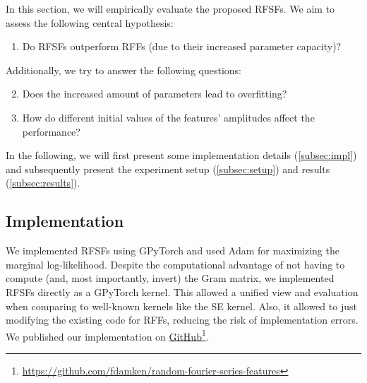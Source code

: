 
In this section, we will empirically evaluate the proposed \acp{RFSF}.
We aim to assess the following central hypothesis:
\begin{enumerate}
    \item Do \acp{RFSF} outperform \acp{RFF} (due to their increased parameter capacity)?
\end{enumerate}
Additionally, we try to answer the following questions:
\begin{enumerate}  \setcounter{enumi}{1}
    \item Does the increased amount of parameters lead to overfitting?
    \item How do different initial values of the features' amplitudes affect the performance?
\end{enumerate}
In the following, we will first present some implementation details (\autoref{subsec:impl}) and subsequently present the experiment setup (\autoref{subsec:setup}) and results (\autoref{subsec:results}).


\subsection{Implementation}  \label{subsec:impl}
We implemented \acp{RFSF} using GPyTorch\cite{jacotNeuralTangentKernel2020} and used Adam\cite{kingmaAdamMethodStochastic2017a} for maximizing the marginal log-likelihood.
Despite the computational advantage of not having to compute (and, most importantly, invert) the Gram matrix, we implemented \acp{RFSF} directly as a GPyTorch kernel.
This allowed a unified view and evaluation when comparing to well-known kernels like the \ac{SE} kernel.
Also, it allowed to just modifying the existing code for \acp{RFF}, reducing the risk of implementation errors.
We published our implementation on \href{https://github.com/fdamken/random-fourier-series-features}{GitHub}\footnote{\url{https://github.com/fdamken/random-fourier-series-features}}.


